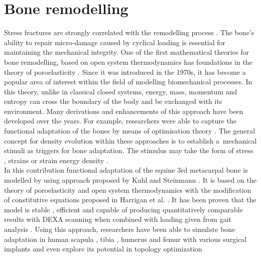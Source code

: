 \documentclass[11pt]{ACMEarticle}
\numberwithin{equation}{section}
\begin{document}
\section{Bone remodelling} 
\label{sec:bone_remodel}
Stress fractures are strongly correlated with the remodelling process \citep{hughes2017role}. 
The bone's ability to repair micro-damage caused by cyclical loading is essential for maintaining the mechanical integrity. 
One of the first mathematical theories for bone remodelling, based on open system thermodynamics has foundations in the 
theory of poroelasticity \citep{cowin1976bone}. 
Since it was introduced in the 1970s, it has become a popular area of interest within the field of modelling biomechanical processes. 
In this theory, unlike in classical closed systems, energy, mass, momentum and entropy can cross the boundary of the body and 
be exchanged with its environment. 
Many derivations and enhancements of this approach have been developed over the years. 
For example, researchers were able to capture the functional adaptation of the bones by means of optimisation theory
 \citep{harrigan1996bone, jacobs1995numerical, weinans1992behavior}.
The general concept for density evolution within these approaches is to establish a~mechanical stimuli as triggers for bone adaptation. 
The stimulus may take the form of stress \citep{beaupre1990approach, carter1996mechanical, doblare2002anisotropic}, strains \citep{cowin1976bone} or strain energy density \citep{weinans1992behavior, kuhl2003theory,kaczmarczyk2011efficient, Connor2017bone}. 
\\ 
In this contribution functional adaptation of the equine 3rd metacarpal bone is modelled by using approach proposed by Kuhl and Steinmann \citep{kuhl2003theory}. 
It is based on the theory of poroelasticity and open system thermodynamics with the modification of constitutive equations proposed in Harrigan et al. 
\citep{harrigan1996bone}. 
It has been proven that the model is stable \citep{kuhl2003computational}, efficient \citep{kaczmarczyk2011efficient} and capable of 
producing quantitatively comparable results with DEXA scanning when combined with loading given from gait analysis \citep{pang2012computational}. 
Using this approach, researchers have been able to simulate bone adaptation in human scapula \citep{liedtke2017computational}, 
tibia \citep{pang2012computational}, humerus \citep{taylor2009phenomenon} and femur with various surgical implants 
\citep{ambrosi2011perspectives, Connor2017bone} and even explore its potential in topology optimization 
\end{document}
